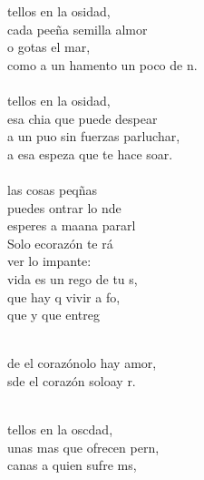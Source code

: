 \begin{cancion}%
	tellos en la osidad,\\
	cada peeña semilla almor\\
	o gotas  el mar,\\
	como a un hamento un poco de n.\\
\jump\\
	tellos en la osidad,\\
	esa chia que puede despear\\
	a un puo sin fuerzas parluchar,\\
	a esa espeza que te hace soar.\\
\jump\\
	 las cosas peqñas \\
	puedes ontrar lo nde\\
	esperes a maana pararl\\
	Solo ecorazón te rá \\
	ver lo impante: \\
	 vida es un rego de tu s,\\
	que hay q vivir a fo, \\
	que y que entreg   \\\jump\\
	\begin{chorus}%
	de el corazónolo hay amor,\\
	sde el corazón soloay r.\\
	\end{chorus}%
	\jump\\
	tellos en la oscdad,\\
	unas mas que ofrecen pern, \\
	canas a quien sufre ms,\\

\end{cancion}
